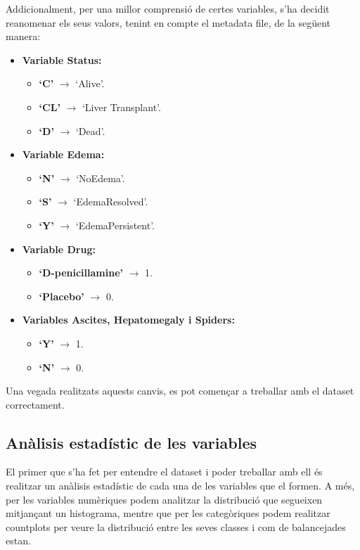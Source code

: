 Addicionalment, per una millor comprensió de certes variables, s'ha decidit reanomenar els seus valors, tenint en compte el metadata file, de la següent manera:
\begin{itemize}
	\item \textbf{Variable Status:}
	\begin{itemize}
		\item \textbf{`C'} $\rightarrow$ `Alive'.
		\item \textbf{`CL'} $\rightarrow$ `Liver Transplant'.
		\item \textbf{`D'} $\rightarrow$ `Dead'.
	\end{itemize}
	
	\item \textbf{Variable Edema:}
	\begin{itemize}
		\item \textbf{`N'} $\rightarrow$ `NoEdema'.
		\item \textbf{`S'} $\rightarrow$ `EdemaResolved'.
		\item \textbf{`Y'} $\rightarrow$ `EdemaPersistent'.
	\end{itemize}
	
	\item \textbf{Variable Drug:}
	\begin{itemize}
		\item \textbf{`D-penicillamine'} $\rightarrow$ 1.
		\item \textbf{`Placebo'} $\rightarrow$ 0.
	\end{itemize}
	
	\item \textbf{Variables Ascites, Hepatomegaly i Spiders:}
	\begin{itemize}
		\item \textbf{`Y'} $\rightarrow$ 1.
		\item \textbf{`N'} $\rightarrow$ 0.
	\end{itemize}	
\end{itemize}

Una vegada realitzats aquests canvis, es pot començar a treballar amb el dataset correctament.

\subsection{Anàlisis estadístic de les variables}
El primer que s'ha fet per entendre el dataset i poder treballar amb ell és realitzar un anàlisis estadístic de cada una de les variables que el formen. A més, per les variables numèriques podem analitzar la distribució que segueixen mitjançant un histograma, mentre que per les categòriques podem realitzar countplots per veure la distribució entre les seves classes i com de balancejades estan.

